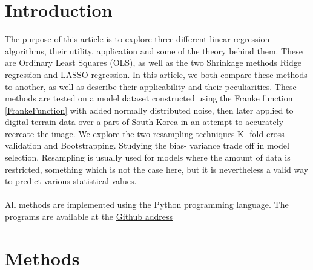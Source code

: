 \documentclass[11pt,a4paper,titlepage]{article}
\begin{document}
\section{Introduction}
The purpose of this article is to explore three different linear regression algorithms, their utility, application and some of the theory behind them. These are Ordinary Least Squares (OLS), as well as the two Shrinkage methods Ridge regression and LASSO regression. In this article, we both compare these methods to another, as well as describe their applicability and their peculiarities. These methods are tested on a model dataset constructed using the Franke function \eqref{FrankeFunction} with added normally distributed noise, then later applied to digital terrain data over a part of South Korea in an attempt to accurately recreate the image. We explore the two resampling techniques K- fold cross validation and Bootstrapping. Studying the bias- variance trade off in model selection. Resampling is usually used for models where the amount of data is restricted, something which is not the case here, but it is nevertheless a valid way to predict various statistical values.\\\\All methods are implemented using the Python programming language. The programs are available at the \href{https://github.com/schraderSimon/FYS-STK/tree/master/project1}{Github address}
\section{Methods}
\end{document}
